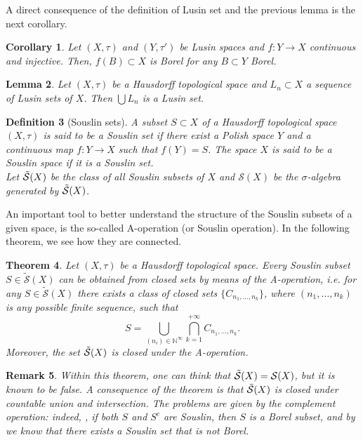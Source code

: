 \documentclass[10pt,leqno]{amsart}
\numberwithin{equation}{section}
\newtheorem{teorema}{Theorem}[section]
\newtheorem{co}[teorema]{Corollary}
\newtheorem{lemma}[teorema]{Lemma}
\newtheorem{df}[teorema]{Definition}
\newtheorem{oss}[teorema]{Remark}
\newcommand{\N}{\mathbb{N}}
\begin{document}
\noindent A direct consequence of the definition of Lusin set and the previous lemma is the next corollary.

\begin{co}\label{cont and inj image of Borel sets}
    Let $(X,\tau)$ and $(Y,\tau')$ be Lusin spaces and $f:Y \to X$ continuous and injective. Then, $f(B)\subset X$ is Borel for any $B\subset Y$ Borel. 
\end{co}

\begin{lemma}\label{union of lusin}
    Let $(X,\tau)$ be a Hausdorff topological space and $L_n\subset X$ a sequence of Lusin sets of $X$. Then $\bigcup L_n $ is a Lusin set.
\end{lemma}



\begin{df}[Souslin sets]
    A subset $S\subset X$ of a Hausdorff topological space $(X,\tau)$ is said to be a \textit{Souslin set} if there exist a Polish space $Y$ and a continuous map $f:Y\to X$ such that $f(Y) = S$. The space $X$ is said to be a \textit{Souslin space} if it is a Souslin set.
    \\
    Let $\Tilde{\mathcal{S}}(X)$ be the class of all Souslin subsets of $X$ and $\mathcal{S}(X)$ be the $\sigma$-algebra generated by $\Tilde{\mathcal{S}}(X)$.
\end{df}

An important tool to better understand the structure of the Souslin subsets of a given space, is the so-called A-operation (or Souslin operation). In the following theorem, we see how they are connected.

\begin{teorema}
    Let $(X,\tau)$ be a Hausdorff topological space. Every Souslin subset $S\in \tilde{\mathcal{S}}(X)$ can be obtained from closed sets by means of the A-operation, i.e. for any $S\in \tilde{\mathcal{S}}(X)$ there exists a class of closed sets $\{C_{n_1,\dots,n_k}\}$, where $(n_1,\dots,n_k)$ is any possible finite sequence, such that 
    \begin{equation}
        S = \bigcup_{(n_i)\in \N^{\infty}}\bigcap_{k=1}^{+\infty} C_{n_1,\dots,n_k}.
    \end{equation}
    Moreover, the set $\Tilde{\mathcal{S}}(X)$ is closed under the A-operation. 
\end{teorema}

\begin{oss}
    Within this theorem, one can think that $\Tilde{\mathcal{S}}(X) = \mathcal{S}(X)$, but it is known to be false. A consequence of the theorem is that $\Tilde{\mathcal{S}}(X)$ is closed under countable union and intersection. The problems are given by the complement operation: indeed, \cite[Corollary 6.6.10]{Bogachev07}, if both $S$ and $S^c$ are Souslin, then $S$ is a Borel subset, and by \cite[Theorem 6.7.10]{Bogachev07} we know that there exists a Souslin set that is not Borel.
\end{oss}
\end{document}
